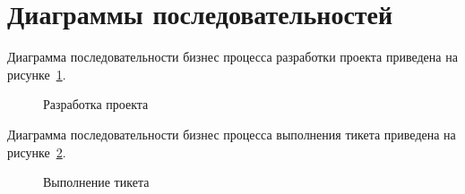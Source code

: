 \section{Диаграммы последовательностей}
Диаграмма последовательности бизнес процесса разработки проекта приведена на рисунке~\ref{fig:sequenceProject}.
\begin{figure}[h]
	\caption{Разработка проекта}
	\label{fig:sequenceProject}
\end{figure}

Диаграмма последовательности бизнес процесса выполнения тикета приведена на рисунке~\ref{fig:sequenceTicket}.
\begin{figure}[h]
	\caption{Выполнение тикета}
	\label{fig:sequenceTicket}
\end{figure}

